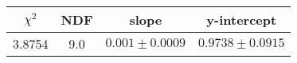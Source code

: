 \begin{tabular}{|c|c|c|c|}

\hline
$\chi^{2}$ & NDF & slope & y-intercept  \\
\hline
3.8754 & 9.0 & $0.001\pm0.0009$ & $0.9738\pm0.0915$ \\
\hline

\end{tabular}